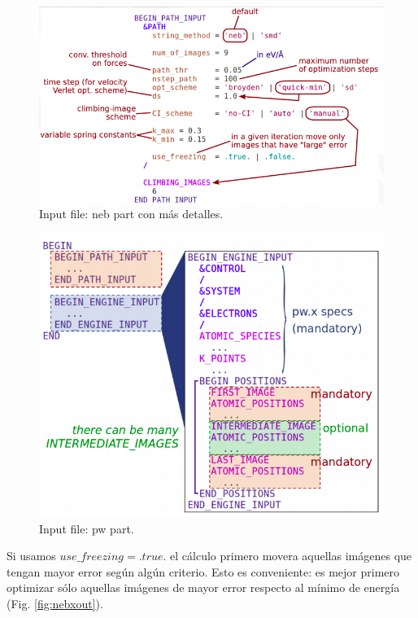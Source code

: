   \begin{figure}[H]
      \centering
      \includegraphics[scale = 0.4]{figs/D3/nebx_2.png}
      \caption{Input file: neb part con más detalles.}
      \label{fig:nebx_2}
  \end{figure}

  \begin{figure}[H]
      \centering
      \includegraphics[scale = 0.4]{figs/D3/pwx.png}
      \caption{Input file: pw part.}
      \label{fig:pwx}
  \end{figure}

  Si usamos $use\_freezing = .true.$ el cálculo primero movera aquellas imágenes que tengan mayor error según algún criterio. Esto es conveniente: es mejor primero optimizar sólo aquellas imágenes de mayor error respecto al mínimo de energía (Fig. \ref{fig:nebxout}).

